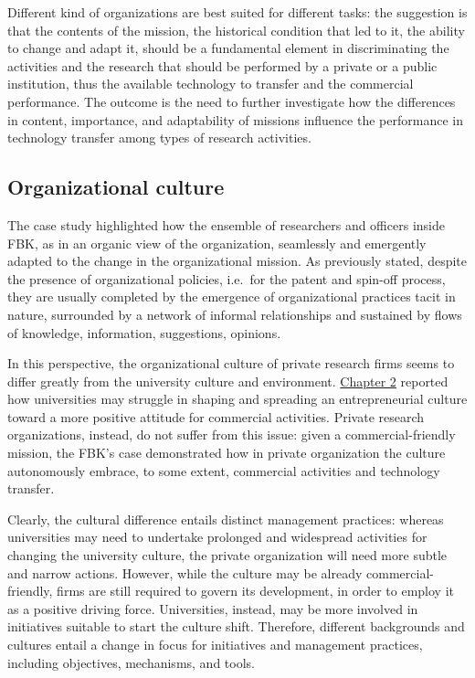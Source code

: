 Different kind of organizations are best suited for different tasks: the suggestion is that the contents of the mission, the historical condition that led to it, the ability to change and adapt it, should be a fundamental element in discriminating the activities and the research that should be performed by a private or a public institution, thus the available technology to transfer and the commercial performance. The outcome is the need to further investigate how the differences in content, importance, and adaptability of missions influence the performance in technology transfer among types of research activities.

\subsection{Organizational culture}

The case study highlighted how the ensemble of researchers and officers inside FBK, as in an organic view of the organization, seamlessly and emergently adapted to the change in the organizational mission. As previously stated, despite the presence of organizational policies, i.e.\ for the patent and spin-off process, they are usually completed by the emergence of organizational practices tacit in nature, surrounded by a network of informal relationships and sustained by flows of knowledge, information, suggestions, opinions. 

In this perspective, the organizational culture of private research firms seems to differ greatly from the university culture and environment. \hyperref[Chapter2]{Chapter 2} reported how universities may struggle in shaping and spreading an entrepreneurial culture toward a more positive attitude for commercial activities. Private research organizations, instead, do not suffer from this issue: given a commercial-friendly mission, the FBK's case demonstrated how in private organization the culture autonomously embrace, to some extent, commercial activities and technology transfer. 

Clearly, the cultural difference entails distinct management practices: whereas universities may need to undertake prolonged and widespread activities for changing the university culture, the private organization will need more subtle and narrow actions. However, while the culture may be already commercial-friendly, firms are still required to govern its development, in order to employ it as a positive driving force. Universities, instead, may be more involved in initiatives suitable to start the culture shift. Therefore, different backgrounds and cultures entail a change in focus for initiatives and management practices, including objectives, mechanisms, and tools.

